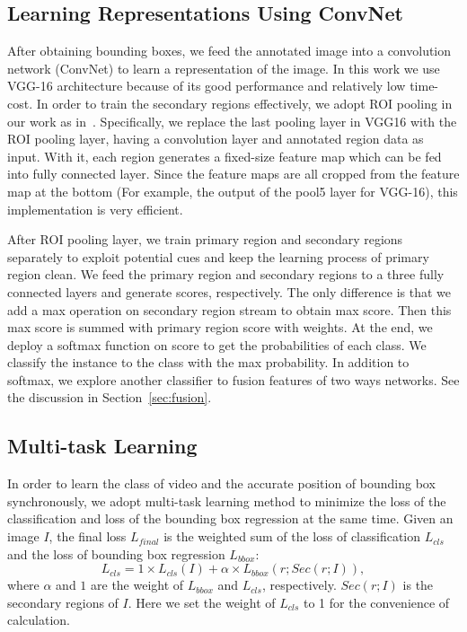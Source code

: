 \documentclass[10pt,twocolumn,letterpaper]{article}
\begin{document}
\subsection{Learning Representations Using ConvNet}
After obtaining bounding boxes, we feed the annotated image into a convolution network (ConvNet) to learn a representation of the image. In this work we use VGG-16 architecture because of its good performance and relatively low time-cost. In order to train the secondary regions effectively, we adopt ROI pooling in our work as in~\cite{gkioxari2015contextual}. Specifically,  we replace the last pooling layer in VGG16 with the ROI pooling layer, having a convolution layer and annotated region data as input. With it, each region generates a fixed-size feature map which can be fed into fully connected layer. Since the feature maps are all cropped from the feature map at the bottom (For example, the output of the pool5 layer for VGG-16), this implementation is very efficient. 

After ROI pooling layer, we train primary region and secondary regions separately to exploit potential cues and keep the learning process of primary region clean. We feed the primary region and secondary regions to a three fully connected layers and generate scores, respectively. The only difference is that we add a max operation on secondary region stream to obtain max score. Then this max score is summed with primary region score with weights. At the end, we deploy a softmax function on score to get the probabilities of each class. We classify the instance to the class with the max probability. In addition to softmax, we explore another classifier to fusion features of two ways networks. See the discussion in Section~\ref{sec:fusion}.

\subsection{Multi-task Learning}
In order to learn the class of video and the accurate position of bounding box 
synchronously, we adopt multi-task learning method to minimize the loss of the classification and loss of the bounding box regression at the same time. Given 
an image $I$, the final loss $L_{final}$ is the weighted sum of the loss of classification $L_{cls}$ and the loss of bounding box regression $L_{bbox}$:
$$L_{cls} = 1\times L_{cls}(I) + \alpha\times L_{bbox}(r;Sec(r;I)),$$
where $\alpha$ and $1$ are the weight of $L_{bbox}$ and $L_{cls}$, respectively. $Sec(r;I)$ is the secondary regions of $I$. Here we set the weight of $L_{cls}$ to 1 for the convenience of calculation. 
\end{document}
